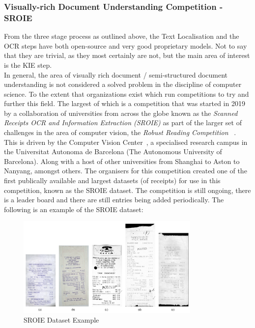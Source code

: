\subsubsection{Visually-rich Document Understanding Competition - SROIE}
From the three stage process as outlined above, the Text Localisation and the OCR steps have both open-source and very good proprietary models.
Not to say that they are trivial, as they most certainly are not, but the main area of interest is the KIE step.\\
In general, the area of visually rich document / semi-structured document understanding is not considered a solved problem in the discipline of
computer science. To the extent that organizations exist which run competitions to try and further this field. The largest of which
is a competition that was started in 2019 by a collaboration of universities from across the globe known as the \emph{Scanned Receipts OCR
	and Information Extraction (SROIE)} as part of the larger set of challenges in the area of computer vision, the \emph{Robust Reading Competition}
~\autocite{OverviewICDAR2019}. This is driven by the Computer Vision Center~\autocite{ComputerVisionCenter}, a specialised research campus
in the Universitat Autonoma de Barcelona (The Autonomous University of Barcelona). Along with a host of other universities from Shanghai to
Aston to Nanyang, amongst others.
\bigbreak
The organisers for this competition created one of the first publically available and largest datasets
(of receipts) for use in this competition, known as the SROIE dataset. The competition is still ongoing, there is a leader board and there are still entries being added periodically.
The following is an example of the SROIE dataset:
\begin{figure}[H]
	\centering
	\includegraphics[width=0.8\textwidth]{figures/sroie_example.png}

	\caption{SROIE Dataset Example}
	\label{fig:sroie_dataset_example}
\end{figure}
